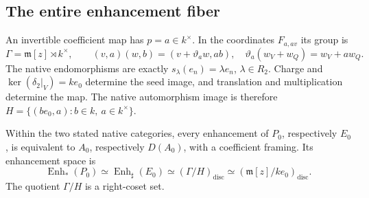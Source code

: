 \subsection{The entire enhancement fiber}

An invertible coefficient map has $p=a\in k^\times$.
In the coordinates $F_{a,av}$ its group is
\begin{equation}\label{v4-arith:md:eq:framing-group}
 \Gamma=\mathfrak m[z]\rtimes k^\times,
 \qquad(v,a)(w,b)=(v+\vartheta_aw,ab),
 \quad\vartheta_a(w_V+w_Q)=w_V+aw_Q.
\end{equation}
The native endomorphisms are exactly
$s_\lambda(e_n)=\lambda e_n$, $\lambda\in R_2$.
Charge and $\ker(\delta_2|_V)=ke_0$ determine
the seed image, and translation and multiplication
determine the map. The native automorphism image
is therefore
$H=\{(be_0,a):b\in k,\ a\in k^\times\}$.

\begin{theorem}
\label{v4-arith:md:thm:fibres}
Within the two stated native categories, every
enhancement of $P_0$, respectively $E_0$, is
equivalent to $A_0$, respectively $D(A_0)$,
with a coefficient framing. Its enhancement
space is
\begin{equation}\label{v4-arith:md:eq:fibres}
 \operatorname{Enh}_*(P_0)
 \simeq\operatorname{Enh}_\sharp(E_0)
 \simeq(\Gamma/H)_{\mathrm{disc}}
 \simeq(\mathfrak m[z]/ke_0)_{\mathrm{disc}}.
\end{equation}
The quotient $\Gamma/H$ is a right-coset set.
\end{theorem}

